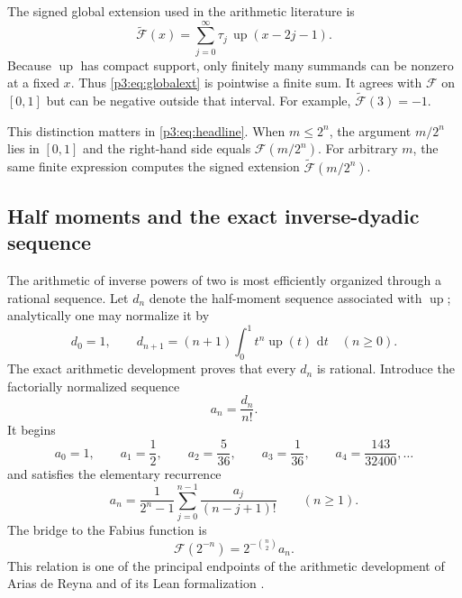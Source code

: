 \documentclass[11pt,oneside]{article}
\theoremstyle{definition}
\theoremstyle{remark}
\newcommand{\F}{\mathcal F}
\newcommand{\G}{\widetilde{\mathcal F}}
\newcommand{\upfun}{\operatorname{up}}
\newcommand{\dd}{\,\mathrm d}
\newcommand{\tm}{\tau}
\begin{document}
The signed global extension used in the arithmetic literature is
\begin{equation}\label{p3:eq:globalext}
  \G(x)=\sum_{j=0}^{\infty}\tm_j\,
  \upfun(x-2j-1).
\end{equation}
Because $\upfun$ has compact support, only finitely many summands can be nonzero at a fixed $x$.  Thus \eqref{p3:eq:globalext} is pointwise a finite sum.  It agrees with $\F$ on $[0,1]$ but can be negative outside that interval.  For example, $\G(3)=-1$.

This distinction matters in \eqref{p3:eq:headline}.  When $m\le2^n$, the argument $m/2^n$ lies in $[0,1]$ and the right-hand side equals $\F(m/2^n)$.  For arbitrary $m$, the same finite expression computes the signed extension $\G(m/2^n)$.

\subsection{Half moments and the exact inverse-dyadic sequence}

The arithmetic of inverse powers of two is most efficiently organized through a rational sequence.  Let $d_n$ denote the half-moment sequence associated with $\upfun$; analytically one may normalize it by
\begin{equation}\label{p3:eq:halfmoments}
 d_0=1,
 \qquad
 d_{n+1}=(n+1)\int_0^1 t^n\upfun(t)\,\dd t
 \quad(n\ge0).
\end{equation}
The exact arithmetic development proves that every $d_n$ is rational.  Introduce the factorially normalized sequence
\begin{equation}\label{p3:eq:an}
  a_n=\frac{d_n}{n!}.
\end{equation}
It begins
\[
 a_0=1,\qquad a_1=\frac12,\qquad
 a_2=\frac5{36},\qquad a_3=\frac1{36},\qquad
 a_4=\frac{143}{32400},\ldots
\]
and satisfies the elementary recurrence
\begin{equation}\label{p3:eq:arec}
  a_n=\frac{1}{2^n-1}
  \sum_{j=0}^{n-1}\frac{a_j}{(n-j+1)!}
  \qquad(n\ge1).
\end{equation}
The bridge to the Fabius function is
\begin{equation}\label{p3:eq:Fainverse}
 \boxed{\F(2^{-n})=2^{-\binom n2}a_n.}
\end{equation}
This relation is one of the principal endpoints of the arithmetic development of Arias de Reyna and of its Lean formalization \cite{p3:AriasArithmetic,p3:ProveIt}.
\end{document}
